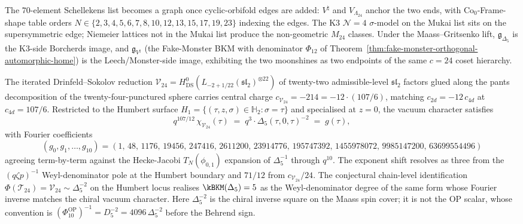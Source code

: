 \begin{remark}[\texorpdfstring{$c = 24$}{c = 24} coset/orbifold graph: \texorpdfstring{$\Delta_5$}{Delta-5} as K3-side Borcherds image, Fake-Monster as Leech-side]
\label{rem:c24-schellekens-killed-coset-surviving-delta5-hidden}
The $70$-element Schellekens list becomes a graph once cyclic-orbifold
edges are added: $V^\natural$ and $V_{\Lambda_{24}}$ anchor the two ends,
with $\mathrm{Co}_0$-Frame-shape table orders
$N\in\{2,3,4,5,6,7,8,10,12,13,15,17,19,23\}$ indexing the edges. The K3
$\mathcal{N}{=}4$ $\sigma$-model on the Mukai list sits on the
supersymmetric edge; Niemeier lattices not in the Mukai list produce the
non-geometric $M_{24}$ classes. Under the Maass--Gritsenko lift,
$\mathfrak{g}_{\Delta_5}$ is the K3-side Borcherds image, and
$\mathfrak{g}_{V^\natural}$ (the Fake-Monster BKM with denominator
$\Phi_{12}$ of Theorem~\ref{thm:fake-monster-orthogonal-automorphic-home})
is the Leech/Monster-side image, exhibiting the two moonshines as two
endpoints of the same $c = 24$ coset hierarchy.
\end{remark}

\begin{conjecture}
\label{conj:V24-delta5-fourier-match}
\ClaimStatusConjectured
The iterated Drinfeld--Sokolov reduction $\mathcal{V}_{24} = H^0_{\mathrm{DS}}(L_{-2 + 1/22}(\mathfrak{sl}_2)^{\otimes 22})$ of twenty-two admissible-level $\mathfrak{sl}_2$ factors glued along the pants decomposition of the twenty-four-punctured sphere carries central charge $c_{\mathcal{V}_{24}} = -214 = -12 \cdot (107/6)$, matching $c_{2d} = -12\,c_{4d}$ at $c_{4d} = 107/6$. Restricted to the Humbert surface $H_1 = \{(\tau, z, \sigma) \in \mathbb{H}_2 : \sigma = \tau\}$ and specialised at $z = 0$, the vacuum character satisfies
\[
 q^{107/12}\,\chi_{\mathcal{V}_{24}}(\tau) \;=\; q^3 \cdot \Delta_5(\tau, 0, \tau)^{-2} \;=\; g(\tau),
\]
with Fourier coefficients
\[
(g_0, g_1, \ldots, g_{10}) = (1,\,48,\,1176,\,19456,\,247416,\,2611200,\,23914776,\,195747392,\,1455978072,\,9985147200,\,63699554496)
\]
agreeing term-by-term against the Hecke-Jacobi $T_N(\phi_{0, 1})$ expansion of $\Delta_5^{-1}$ through $q^{10}$. The exponent shift resolves as three from the $(q \zeta p)^{-1}$ Weyl-denominator pole at the Humbert boundary and $71/12$ from $c_{\mathcal{V}_{24}}/24$. The conjectural chain-level identification $\Phi(\mathcal{T}_{24}) = \mathcal{V}_{24} \sim \Delta_5^{-2}$ on the Humbert locus realises $\kBKM(\Delta_5) = 5$ as the Weyl-denominator degree of the same form whose Fourier inverse matches the chiral vacuum character. Here \(\Delta_5^{-2}\) is the chiral inverse square on the Maass spin cover; it is not the OP scalar, whose convention is \((\Phi_{10}^{\mathrm{OP}})^{-1}=D_5^{-2}=4096\,\Delta_5^{-2}\) before the Behrend sign.
\end{conjecture}

